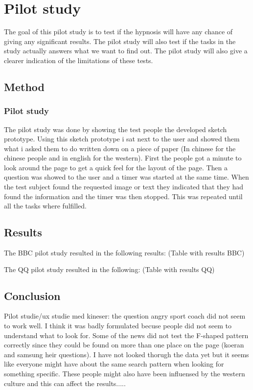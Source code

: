 
\chapter{Pilot study} %

\label{Chapter6} %

The goal of this pilot study is to test if the hypnosis will have any chance of giving any significant results. The pilot study will also test if the tasks in the study actually answers what we want to find out. The pilot study will also give a clearer indication of the limitations of these tests.
\section{Method}
\subsection{Pilot study}
The pilot study was done by showing the test people the developed sketch prototype. Using this sketch prototype i sat next to the user and showed them what i asked them to do written down on a piece of paper (In chinese for the chinese people and in english for the western). First the people got a minute to look around the page to get a quick feel for the layout of the page. Then a question was showed to the user and a timer was started at the same time. When the test subject found the requested image or text they indicated that they had found the information and the timer was then stopped. This was repeated until all the tasks where fulfilled.

\section{Results}
The BBC pilot study resulted in the following results: (Table with results BBC)

The QQ pilot study resulted in the following: (Table with results QQ)
\section{Conclusion}

Pilot studie/ux studie med kineser:
the question angry sport coach did not seem to work well. I think it was badly formulated becuse people did not seem to understand what to look for. Some of the news did not test the F-shaped pattern correctly since they could be found on more than one place on the page (koeran and samsung heir questions). I have not looked thorugh the data yet but it seems like everyone might have about the same search pattern when looking for something specific. These people might also have been influensed by the western culture and this can affect the results.....

